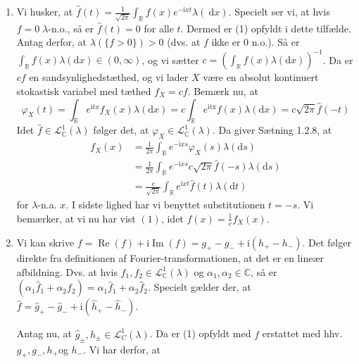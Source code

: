 \documentclass{Class}
\newcommand{\C}{\mathbb{C}}
\newcommand{\1}{\mathbbm{1}}
\theoremstyle{boxed}
\begin{document}
\begin{enumerate}
  \item Vi husker, at $\hat{f}(t)=\frac{1}{\sqrt{2 \pi}} \int_{\mathbb{R}} f(x) e^{-\mathrm{i} x t} \lambda(\mathrm{~d} x)$. Specielt ser vi, at hvis $f=0\; \lambda$-n.o., så er $\hat{f}(t)=0$ for alle $t$. Dermed er (1) opfyldt i dette tilfælde. Antag derfor, at $\lambda(\{f>0\})>0$ (dvs. at $f$ ikke er 0 n.o.). Så er $\int_{\mathbb{R}} f(x) \lambda(\mathrm{d} x) \in(0, \infty)$, og vi sætter $c=\left(\int_{\mathbb{R}} f(x) \lambda(\mathrm{d} x)\right)^{-1}$. Da er $c f$ en sandsynlighedstæthed, og vi lader $X$ være en absolut kontinuert stokastisk variabel med tæthed $f_X=c f$. Bemærk nu, at
  $$
  \varphi_X(t)=\int_{\mathbb{R}} e^{\mathrm{i} t x} f_X(x) \lambda(\mathrm{d} x)=c \int_{\mathbb{R}} e^{\mathrm{itx}} f(x) \lambda(\mathrm{d} x)=c \sqrt{2 \pi} \hat{f}(-t)
  $$
  Idet $\hat{f} \in \mathcal{L}_{\C}^1(\lambda)$ følger det, at $\varphi_X \in \mathcal{L}_{\C}^1(\lambda)$. Da giver Sætning 1.2.8, at
  $$
  \begin{aligned}
  f_X(x) & =\frac{1}{2 \pi} \int_{\mathbb{R}} e^{-\mathrm{i} x s} \varphi_X(s) \lambda(\mathrm{d} s) \\
  & =\frac{1}{2 \pi} \int_{\mathbb{R}} e^{-\mathrm{i} x s} c \sqrt{2 \pi} \hat{f}(-s) \lambda(\mathrm{d} s) \\
  & =\frac{c}{\sqrt{2 \pi}} \int_{\mathbb{R}} e^{\mathrm{i} x t} \hat{f}(t) \lambda(\mathrm{d} t)
  \end{aligned}
  $$
  for $\lambda$-n.a. $x$. I sidste lighed har vi benyttet substitutionen $t=-s$. Vi bemærker, at vi nu har vist $(1)$, idet $f(x)=\frac{1}{c} f_X(x)$.
  \item Vi kan skrive $f=\operatorname{Re}(f)+\mathrm{i} \operatorname{Im}(f)=g_{+}-g_{-}+\mathrm{i}\left(h_{+}-h_{-}\right)$. Det følger direkte fra definitionen af Fourier-transformationen, at det er en lineær afbildning. Dvs. at hvis $f_1, f_2 \in \mathcal{L}_{\mathbb{C}}^1(\lambda)$ og $\alpha_1, \alpha_2 \in \mathbb{C}$, så er $\left(\alpha_1 \widehat{f}_1+\alpha_2 f_2\right)=\alpha_1 \hat{f}_1+\alpha_2 \hat{f}_2$. Specielt gælder der, at $\hat{f}=\hat{g}_{+}-\hat{g}_{-}+\mathrm{i}\left(\hat{h}_{+}-\hat{h}_{-}\right)$.

  Antag nu, at $\hat{g}_{ \pm}, \hat{h}_{ \pm} \in \mathcal{L}_C^1(\lambda)$. Da er (1) opfyldt med $f$ erstattet med hhv. $g_{+}, g_{-}, h_{+}$og $h_{-}$. Vi har derfor, at
  

\end{enumerate}
\end{document}
